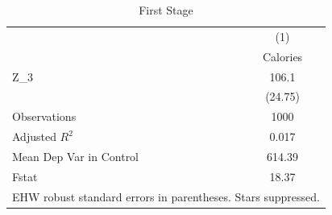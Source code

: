 \begin{table}[htbp]\centering
\caption{First Stage}
\begin{tabular}{l*{1}{c}}
\hline\hline
                    &\multicolumn{1}{c}{(1)}\\
                    &\multicolumn{1}{c}{Calories}\\
\hline
Z\_3                 &       106.1\\
                    &     (24.75)\\
\hline
Observations        &        1000\\
Adjusted \(R^{2}\)  &       0.017\\
Mean Dep Var in Control&      614.39\\
Fstat               &       18.37\\
\hline\hline
\multicolumn{2}{l}{\footnotesize EHW robust standard errors in parentheses. Stars suppressed.}\\
\end{tabular}
\end{table}
